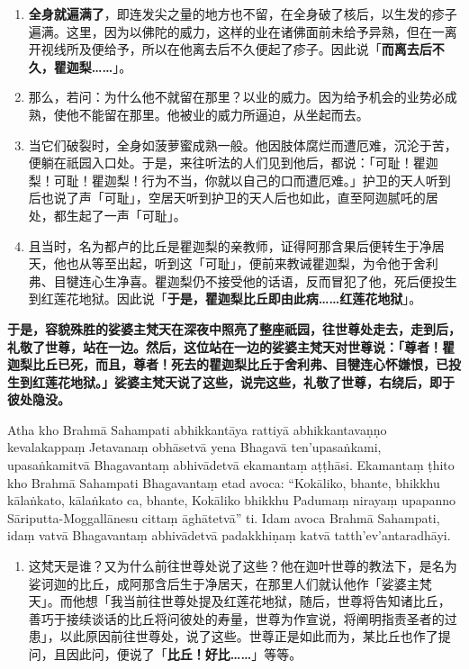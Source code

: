 \begin{enumerate}\item \textbf{全身就遍满了}，即连发尖之量的地方也不留，在全身破了核后，以生发的疹子遍满。这里，因为以佛陀的威力，这样的业在诸佛面前未给予异熟，但在一离开视线所及便给予，所以在他离去后不久便起了疹子。因此说「\textbf{而离去后不久，瞿迦梨……}」。
\item 那么，若问：为什么他不就留在那里？以业的威力。因为给予机会的业势必成熟，使他不能留在那里。他被业的威力所逼迫，从坐起而去。
\item 当它们破裂时，全身如菠萝蜜成熟一般。他因肢体腐烂而遭厄难，沉沦于苦，便躺在祇园入口处。于是，来往听法的人们见到他后，都说：「可耻！瞿迦梨！可耻！瞿迦梨！行为不当，你就以自己的口而遭厄难。」护卫的天人听到后也说了声「可耻」，空居天听到护卫的天人后也如此，直至阿迦腻吒的居处，都生起了一声「可耻」。
\item 且当时，名为都卢的比丘是瞿迦梨的亲教师，证得阿那含果后便转生于净居天，他也从等至出起，听到这「可耻」，便前来教诫瞿迦梨，为令他于舍利弗、目犍连心生净喜。瞿迦梨仍不接受他的话语，反而冒犯了他，死后便投生到红莲花地狱。因此说「\textbf{于是，瞿迦梨比丘即由此病……红莲花地狱}」。\end{enumerate}

\textbf{于是，容貌殊胜的娑婆主梵天在深夜中照亮了整座祇园，往世尊处走去，走到后，礼敬了世尊，站在一边。然后，这位站在一边的娑婆主梵天对世尊说：「尊者！瞿迦梨比丘已死，而且，尊者！死去的瞿迦梨比丘于舍利弗、目犍连心怀嫌恨，已投生到红莲花地狱。」娑婆主梵天说了这些，说完这些，礼敬了世尊，右绕后，即于彼处隐没。}

Atha kho Brahmā Sahampati abhikkantāya rattiyā abhikkantavaṇṇo kevalakappaṃ Jetavanaṃ obhāsetvā yena Bhagavā ten’upasaṅkami, upasaṅkamitvā Bhagavantaṃ abhivādetvā ekamantaṃ aṭṭhāsi. Ekamantaṃ ṭhito kho Brahmā Sahampati Bhagavantaṃ etad avoca: “Kokāliko, bhante, bhikkhu kālaṅkato, kālaṅkato ca, bhante, Kokāliko bhikkhu Padumaṃ nirayaṃ upapanno Sāriputta-Moggallānesu cittaṃ āghātetvā” ti. Idam avoca Brahmā Sahampati, idaṃ vatvā Bhagavantaṃ abhivādetvā padakkhiṇaṃ katvā tatth’ev’antaradhāyi.

\begin{enumerate}\item 这梵天是谁？又为什么前往世尊处说了这些？他在迦叶世尊的教法下，是名为 娑诃迦的比丘，成阿那含后生于净居天，在那里人们就认他作「娑婆主梵天」。而他想「我当前往世尊处提及红莲花地狱，随后，世尊将告知诸比丘，善巧于接续谈话的比丘将问彼处的寿量，世尊为作宣说，将阐明指责圣者的过患」，以此原因前往世尊处，说了这些。世尊正是如此而为，某比丘也作了提问，且因此问，便说了「\textbf{比丘！好比……}」等等。\end{enumerate}

